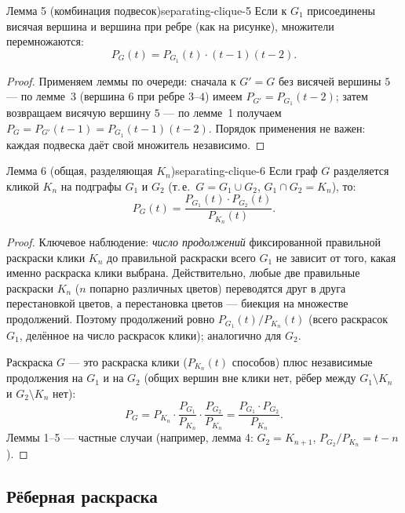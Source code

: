 \begin{lemma}{Лемма 5 (комбинация подвесок)}{separating-clique-5}
Если к $G_1$ присоединены висячая вершина и вершина при ребре
(как на рисунке), множители перемножаются:
\[
  P_G(t) = P_{G_1}(t) \cdot (t-1)(t-2).
\]
\end{lemma}

\begin{proof}
Применяем леммы по очереди: сначала к $G' = G$ без висячей вершины
$5$ --- по лемме~3 (вершина $6$ при ребре $3$--$4$) имеем
$P_{G'} = P_{G_1}(t-2)$; затем возвращаем висячую вершину $5$ --- по
лемме~1 получаем $P_G = P_{G'}(t-1) = P_{G_1}(t-1)(t-2)$. Порядок
применения не важен: каждая подвеска даёт свой множитель независимо.
\end{proof}

\begin{lemma}{Лемма 6 (общая, разделяющая $K_n$)}{separating-clique-6}
Если граф $G$ разделяется кликой $K_n$ на подграфы $G_1$ и $G_2$
(т.\,е.\ $G = G_1 \cup G_2$, $G_1 \cap G_2 = K_n$), то:
\[
  P_G(t) = \frac{P_{G_1}(t) \cdot P_{G_2}(t)}{P_{K_n}(t)}.
\]
\end{lemma}

\begin{proof}
Ключевое наблюдение: \emph{число продолжений} фиксированной правильной
раскраски клики $K_n$ до правильной раскраски всего $G_1$ не зависит
от того, какая именно раскраска клики выбрана. Действительно, любые две
правильные раскраски $K_n$ ($n$ попарно различных цветов) переводятся
друг в друга перестановкой цветов, а перестановка цветов --- биекция
на множестве продолжений. Поэтому продолжений ровно
$P_{G_1}(t) / P_{K_n}(t)$ (всего раскрасок $G_1$, делённое на число
раскрасок клики); аналогично для $G_2$.

Раскраска $G$ --- это раскраска клики ($P_{K_n}(t)$ способов) плюс
независимые продолжения на $G_1$ и на $G_2$ (общих вершин вне клики
нет, рёбер между $G_1 \setminus K_n$ и $G_2 \setminus K_n$ нет):
\[
  P_G = P_{K_n} \cdot \frac{P_{G_1}}{P_{K_n}} \cdot \frac{P_{G_2}}{P_{K_n}}
      = \frac{P_{G_1} \cdot P_{G_2}}{P_{K_n}}.
\]
Леммы 1--5 --- частные случаи (например, лемма 4: $G_2 = K_{n+1}$,
$P_{G_2}/P_{K_n} = t - n$).
\end{proof}

\subsection*{Рёберная раскраска}

